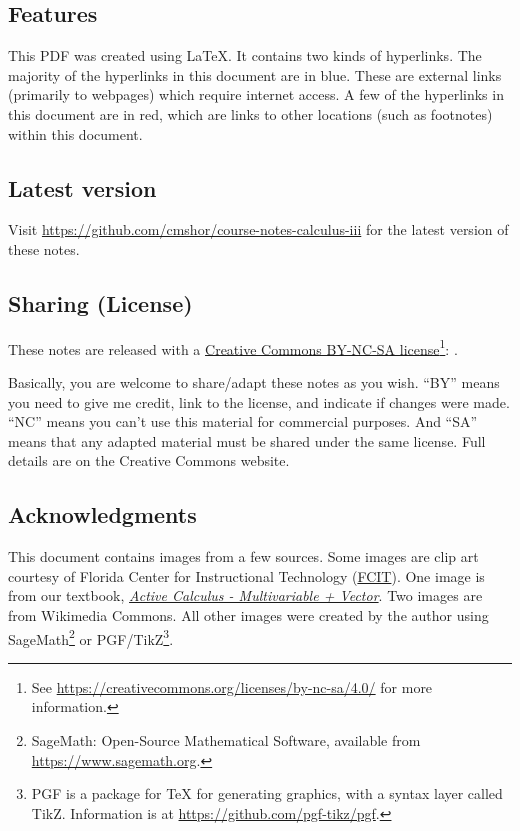 \subsection*{Features}
This PDF was created using \LaTeX. It contains two kinds of hyperlinks. The majority of the hyperlinks in this document are in blue. These are external links (primarily to webpages) which require internet access. A few of the hyperlinks in this document are in red, which are links to other locations (such as footnotes) within this document.

\subsection*{Latest version}
Visit \url{https://github.com/cmshor/course-notes-calculus-iii} for the latest version of these notes.

\subsection*{Sharing (License)}
These notes are released with a \href{https://creativecommons.org/licenses/by-nc-sa/4.0/}{Creative Commons BY-NC-SA license}\footnote{See \url{https://creativecommons.org/licenses/by-nc-sa/4.0/} for more information.}: \cctag. 

Basically, you are welcome to share/adapt these notes as you wish. ``BY'' means you need to give me credit, link to the license, and indicate if changes were made. ``NC'' means you can't use this material for commercial purposes. And ``SA'' means that any adapted material must be shared under the same license. Full details are on the Creative Commons website.

\vfill\mbox{}
\pagebreak 

\subsection*{Acknowledgments}
This document contains images from a few sources. Some images are clip art courtesy of Florida Center for Instructional Technology (\href{https://etc.usf.edu/clipart/}{FCIT}). One image is from our textbook, \href{https://activecalculus.org/vector/frontmatter.html}{\textit{Active Calculus - Multivariable + Vector}}. Two images are from Wikimedia Commons. All other images were created by the author using SageMath\footnote{SageMath: Open-Source Mathematical Software, available from \url{https://www.sagemath.org}.} or PGF/TikZ\footnote{PGF is a package for TeX for generating graphics, with a syntax layer called TikZ. Information is at \mbox{\url{https://github.com/pgf-tikz/pgf}}.}.

